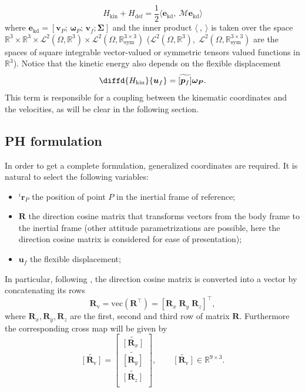 \documentclass{svjour3}                     %
\newcommand{\crmat}[1]{\ensuremath{\widetilde{\left[#1\right]}}}
\begin{document}
	\begin{equation}
	H_{\text{kin}} + H_{\text{def}} = \frac{1}{2} \langle \bm{e}_{\text{kd}}, \ \bm{\mathcal{M}} \bm{e}_{\text{kd}} \rangle
	\end{equation}
	where $\bm{e}_{\text{kd}} = [\bm{v}_P; \, \bm{\omega}_P; \, \bm{v}_f; \bm{\Sigma}]$ and the inner product $\langle \ , \ \rangle$ is taken over the space $\mathbb{R}^3 \times \mathbb{R}^3 \times \mathscr{L}^2(\Omega, \mathbb{R}^3) \times \mathscr{L}^2(\Omega, \mathbb{R}^{3\times 3}_{\text{sym}})$ ($\mathscr{L}^2(\Omega, \mathbb{R}^3), \; \mathscr{L}^2(\Omega, \mathbb{R}^{3\times 3}_{\text{sym}})$ are the spaces of square integrable vector-valued or symmetric tensors valued functions in $\mathbb{R}^3$). Notice that the kinetic energy also depends on the flexible displacement
	\[
	\diffd{H_{\text{kin}}}{\bm{u}_f} = \crmat{\bm{p}_f} \bm{\omega_{P}}.
	\]
	This term is responsible for a coupling between the kinematic coordinates and the velocities, as will be clear in the following section. 
	
	\subsection{PH formulation}
	In order to get a complete formulation, generalized coordinates are required. It is natural to select the following variables:
	\begin{itemize}
		\item $^i \bm{r}_P$ the position of point $P$ in the inertial frame of reference;
		\item $\bm{R}$ the direction cosine matrix that transforms vectors from the body frame to the inertial frame (other attitude parametrizations are possible, here the direction cosine matrix is considered for ease of presentation);
		\item $\bm{u}_f$ the flexible displacement;
	\end{itemize}
	
	In particular, following \cite{attitude_ph}, the direction cosine matrix is converted into a vector by concatenating its rows
	\begin{equation*}
	\bm{R}_{\text{v}} = \text{vec}(\bm{R}^\top) = [\bm{R}_x \; \bm{R}_y \; \bm{R}_z]^\top,
	\end{equation*}
	where $\bm{R}_{x}, \bm{R}_{y}, \bm{R}_{z}$ are the first, second and third row of matrix $\bm{R}$. Furthermore the corresponding cross map will be given by
	\begin{equation*}
	\crmat{\bm{R}_{\text{v}}} = 
	\begin{bmatrix}
	\crmat{\bm{R}_x} \\
	\crmat{\bm{R}_y} \\
	\crmat{\bm{R}_z} \\
	\end{bmatrix}, \qquad 
	\crmat{\bm{R}_{\text{v}}} \in \mathbb{R}^{9 \times 3}.
	\end{equation*}
	
\end{document}
